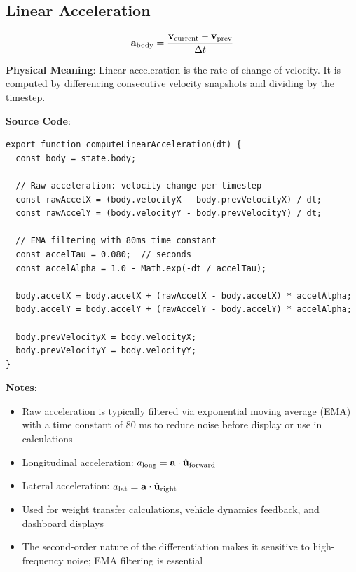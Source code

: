 \subsection{Linear Acceleration}

\begin{equation}
  \mathbf{a}_{\text{body}} = \frac{\mathbf{v}_{\text{current}} - \mathbf{v}_{\text{prev}}}{\Delta t}
  \label{eq:linear-acceleration}
\end{equation}

\textbf{Physical Meaning}: Linear acceleration is the rate of change of velocity. It is computed by differencing consecutive velocity snapshots and dividing by the timestep.

\textbf{Source Code}: 

\begin{lstlisting}[caption={Linear acceleration computation and EMA filtering}]
export function computeLinearAcceleration(dt) {
  const body = state.body;

  // Raw acceleration: velocity change per timestep
  const rawAccelX = (body.velocityX - body.prevVelocityX) / dt;
  const rawAccelY = (body.velocityY - body.prevVelocityY) / dt;

  // EMA filtering with 80ms time constant
  const accelTau = 0.080;  // seconds
  const accelAlpha = 1.0 - Math.exp(-dt / accelTau);

  body.accelX = body.accelX + (rawAccelX - body.accelX) * accelAlpha;
  body.accelY = body.accelY + (rawAccelY - body.accelY) * accelAlpha;

  body.prevVelocityX = body.velocityX;
  body.prevVelocityY = body.velocityY;
}
\end{lstlisting}

\textbf{Notes}:
\begin{itemize}
  \item Raw acceleration is typically filtered via exponential moving average (EMA) with a time constant of 80 ms to reduce noise before display or use in calculations
  \item Longitudinal acceleration: $a_{\text{long}} = \mathbf{a} \cdot \hat{\mathbf{u}}_{\text{forward}}$
  \item Lateral acceleration: $a_{\text{lat}} = \mathbf{a} \cdot \hat{\mathbf{u}}_{\text{right}}$
  \item Used for weight transfer calculations, vehicle dynamics feedback, and dashboard displays
  \item The second-order nature of the differentiation makes it sensitive to high-frequency noise; EMA filtering is essential
\end{itemize}

